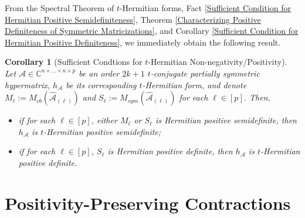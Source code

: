 \documentclass[11pt]{article}
\newtheorem{corollary}[theorem]{Corollary}
\begin{document}
From the Spectral Theorem of $t$-Hermitian forms, Fact \ref{Sufficient Condition for Hermitian Positive Semidefiniteness}, Theorem \ref{Characterizing Positive Definiteness of Symmetric Matricizations}, and Corollary \ref{Sufficient Condition for Hermitian Positive Definiteness}, we immediately obtain the following result. 
\begin{corollary}[Sufficient Condtions for $t$-Hermitian Non-negativity/Positivity]\label{Sufficient Condtions for t-Hermitian Non-negativity/Positivity}
    Let $\mathcal{A}\in \mathbb{C}^{n\times\dots\times n\times p}$ be an order $2k+1$ $t$-conjugate partially symmetric hypermatrix, $h_{\mathcal{A}}$ be its corresponding $t$-Hermitian form, and denote $ M_{\ell} := M_{cb}(\widehat{\mathcal{A}}_{(\ell)})$ and $S_{\ell} := M_{sym}(\widehat{\mathcal{A}}_{(\ell)})$ for each $\ell\in [p]$. Then, 
    \begin{itemize}
        \item if for each $\ell\in [p]$, either $M_{\ell}$ or $S_{\ell}$ is Hermitian positive semidefinite, then $h_{\mathcal{A}}$ is $t$-Hermitian positive semidefinite;  
        \item if for each $\ell\in [p]$, $S_{\ell}$ is Hermitian positive definite, then $h_{\mathcal{A}}$ is $t$-Hermitian positive definite. 
    \end{itemize}
\end{corollary}

\section{Positivity-Preserving Contractions}\label{Application to Classical Hermitian Forms}
\end{document}
